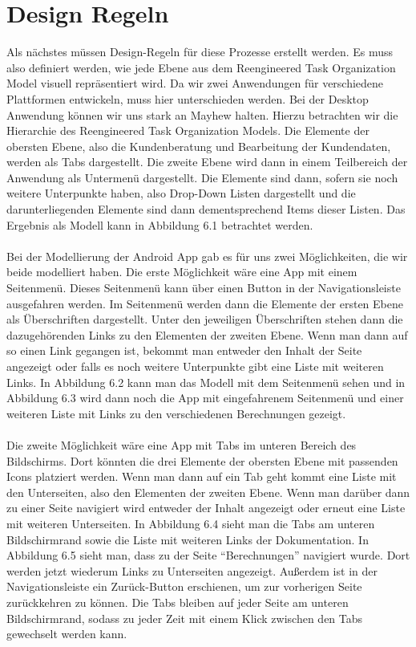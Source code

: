 \section{Design Regeln}

Als nächstes müssen Design-Regeln für diese Prozesse erstellt werden.  Es muss also definiert werden, wie jede Ebene aus dem Reengineered Task Organization Model visuell repräsentiert wird. Da wir zwei Anwendungen für verschiedene Plattformen entwickeln, muss hier unterschieden werden. Bei der Desktop Anwendung können wir uns stark an Mayhew halten. Hierzu betrachten wir die Hierarchie des Reengineered Task Organization Models. Die Elemente der obersten Ebene, also die Kundenberatung und Bearbeitung der Kundendaten, werden als Tabs dargestellt. Die zweite Ebene wird dann in einem Teilbereich der Anwendung als Untermenü dargestellt. Die Elemente sind dann, sofern sie noch weitere Unterpunkte haben, also Drop-Down Listen dargestellt und die darunterliegenden Elemente sind dann dementsprechend Items dieser Listen. Das Ergebnis als Modell kann in Abbildung 6.1 betrachtet werden.
\\ \\
Bei der Modellierung der Android App gab es für uns zwei Möglichkeiten, die wir beide modelliert haben. Die erste Möglichkeit wäre eine App mit einem Seitenmenü. Dieses Seitenmenü kann über einen Button in der Navigationsleiste ausgefahren werden. Im Seitenmenü werden dann die Elemente der ersten Ebene als Überschriften dargestellt. Unter den jeweiligen Überschriften stehen dann die dazugehörenden Links zu den Elementen der zweiten Ebene. Wenn man dann auf so einen Link gegangen ist, bekommt man entweder den Inhalt der Seite angezeigt oder falls es noch weitere Unterpunkte gibt eine Liste mit weiteren Links. In Abbildung 6.2 kann man das Modell mit dem Seitenmenü sehen und in Abbildung 6.3 wird dann noch die App mit eingefahrenem Seitenmenü und einer weiteren Liste mit Links zu den verschiedenen Berechnungen gezeigt.
\\ \\
Die zweite Möglichkeit wäre eine App mit Tabs im unteren Bereich des Bildschirms. Dort könnten die drei Elemente der obersten Ebene mit passenden Icons platziert werden. Wenn man dann auf ein Tab geht kommt eine Liste mit den Unterseiten, also den Elementen der zweiten Ebene. Wenn man darüber dann zu einer Seite navigiert wird entweder der Inhalt angezeigt oder erneut eine Liste mit weiteren Unterseiten. In Abbildung 6.4 sieht man die Tabs am unteren Bildschirmrand sowie die Liste mit weiteren Links der Dokumentation. In Abbildung 6.5 sieht man, dass zu der Seite ``Berechnungen'' navigiert wurde. Dort werden jetzt wiederum Links zu Unterseiten angezeigt. Außerdem ist in der Navigationsleiste ein Zurück-Button erschienen, um zur vorherigen Seite zurückkehren zu können. Die Tabs bleiben auf jeder Seite am unteren Bildschirmrand, sodass zu jeder Zeit mit einem Klick zwischen den Tabs gewechselt werden kann.

